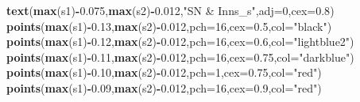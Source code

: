 \documentclass[]{article}
\newenvironment{Shaded}{\begin{snugshade}}{\end{snugshade}}
\newcommand{\DataTypeTok}[1]{\textcolor[rgb]{0.13,0.29,0.53}{#1}}
\newcommand{\DecValTok}[1]{\textcolor[rgb]{0.00,0.00,0.81}{#1}}
\newcommand{\FloatTok}[1]{\textcolor[rgb]{0.00,0.00,0.81}{#1}}
\newcommand{\KeywordTok}[1]{\textcolor[rgb]{0.13,0.29,0.53}{\textbf{#1}}}
\newcommand{\NormalTok}[1]{#1}
\newcommand{\OperatorTok}[1]{\textcolor[rgb]{0.81,0.36,0.00}{\textbf{#1}}}
\newcommand{\StringTok}[1]{\textcolor[rgb]{0.31,0.60,0.02}{#1}}
\begin{document}
\begin{Shaded}
\begin{Highlighting}[]
\KeywordTok{text}\NormalTok{(}\KeywordTok{max}\NormalTok{(s1)}\OperatorTok{-}\FloatTok{0.075}\NormalTok{,}\KeywordTok{max}\NormalTok{(s2)}\OperatorTok{-}\FloatTok{0.012}\NormalTok{,}\StringTok{"SN & Inns_s"}\NormalTok{,}\DataTypeTok{adj=}\DecValTok{0}\NormalTok{,}\DataTypeTok{cex=}\FloatTok{0.8}\NormalTok{)}
\KeywordTok{points}\NormalTok{(}\KeywordTok{max}\NormalTok{(s1)}\OperatorTok{-}\FloatTok{0.13}\NormalTok{,}\KeywordTok{max}\NormalTok{(s2)}\OperatorTok{-}\FloatTok{0.012}\NormalTok{,}\DataTypeTok{pch=}\DecValTok{16}\NormalTok{,}\DataTypeTok{cex=}\FloatTok{0.5}\NormalTok{,}\DataTypeTok{col=}\StringTok{"black"}\NormalTok{)}
\KeywordTok{points}\NormalTok{(}\KeywordTok{max}\NormalTok{(s1)}\OperatorTok{-}\FloatTok{0.12}\NormalTok{,}\KeywordTok{max}\NormalTok{(s2)}\OperatorTok{-}\FloatTok{0.012}\NormalTok{,}\DataTypeTok{pch=}\DecValTok{16}\NormalTok{,}\DataTypeTok{cex=}\FloatTok{0.6}\NormalTok{,}\DataTypeTok{col=}\StringTok{"lightblue2"}\NormalTok{)}
\KeywordTok{points}\NormalTok{(}\KeywordTok{max}\NormalTok{(s1)}\OperatorTok{-}\FloatTok{0.11}\NormalTok{,}\KeywordTok{max}\NormalTok{(s2)}\OperatorTok{-}\FloatTok{0.012}\NormalTok{,}\DataTypeTok{pch=}\DecValTok{16}\NormalTok{,}\DataTypeTok{cex=}\FloatTok{0.75}\NormalTok{,}\DataTypeTok{col=}\StringTok{"darkblue"}\NormalTok{)}
\KeywordTok{points}\NormalTok{(}\KeywordTok{max}\NormalTok{(s1)}\OperatorTok{-}\FloatTok{0.10}\NormalTok{,}\KeywordTok{max}\NormalTok{(s2)}\OperatorTok{-}\FloatTok{0.012}\NormalTok{,}\DataTypeTok{pch=}\DecValTok{1}\NormalTok{,}\DataTypeTok{cex=}\FloatTok{0.75}\NormalTok{,}\DataTypeTok{col=}\StringTok{"red"}\NormalTok{)}
\KeywordTok{points}\NormalTok{(}\KeywordTok{max}\NormalTok{(s1)}\OperatorTok{-}\FloatTok{0.09}\NormalTok{,}\KeywordTok{max}\NormalTok{(s2)}\OperatorTok{-}\FloatTok{0.012}\NormalTok{,}\DataTypeTok{pch=}\DecValTok{16}\NormalTok{,}\DataTypeTok{cex=}\FloatTok{0.9}\NormalTok{,}\DataTypeTok{col=}\StringTok{"red"}\NormalTok{)}


\end{Highlighting}
\end{Shaded}
\end{document}
